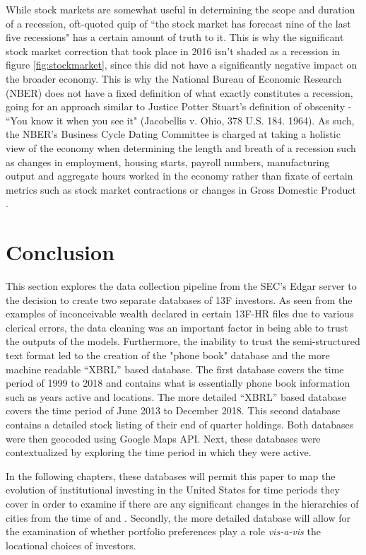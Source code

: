 While stock markets are somewhat useful in determining the scope and duration of a recession, \cite{Samuelson1966} oft-quoted quip of ``the
stock market has forecast nine of the last five recessions" has a certain amount of truth to it. This is why the significant stock market correction that took place in 2016 isn't shaded as a recession in figure \ref{fig:stockmarket}, since this did not have a significantly negative impact on the broader economy. This is why the National Bureau of Economic Research (NBER) does not have a fixed definition of what exactly constitutes a recession, going for an approach similar to Justice Potter Stuart's definition of obscenity - ``You know it when you see it" (Jacobellis v. Ohio, 378 U.S. 184. 1964). As such, the NBER's Business Cycle Dating Committee is charged at taking a holistic view of the economy when determining the length and breath of a recession such as changes in employment, housing starts, payroll numbers, manufacturing output and aggregate hours worked in the economy rather than fixate of certain metrics such as stock market contractions or changes in Gross Domestic Product \citep{NBERBCDC2020}.  




\section{Conclusion}


This section explores the data collection pipeline from the SEC's Edgar server to the decision to create two separate databases of 13F investors. As seen from the examples of inconceivable wealth declared in certain 13F-HR files due to various clerical errors, the data cleaning was an important factor in being able to trust the outputs of the models.  Furthermore, the inability to trust the semi-structured text format led to the creation of the "phone book" database and the more machine readable ``XBRL'' based database.  The first database covers the time period of 1999 to 2018 and contains what is essentially phone book information such as years active and locations. The more detailed ``XBRL'' based database covers the time period of June 2013 to December 2018.  This second database contains a detailed stock listing of their end of quarter holdings.  Both databases were then geocoded using Google Maps API.  Next, these databases were contextualized by exploring the time period in which they were active.  

In the following chapters, these databases will permit this paper to map the evolution of institutional investing in the United States for time periods they cover in order to examine if there are any significant changes in the hierarchies of cities from the time of \cite{greena1993} and \cite{gravesthe1998}.  Secondly, the more detailed database will allow for the examination of whether portfolio preferences play a role \textit{vis-a-vis} the locational choices of investors.  

